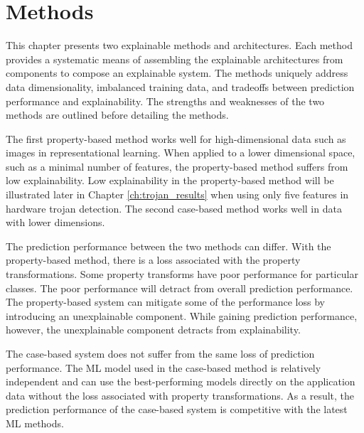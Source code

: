 \chapter{Methods} \label{ch:methods}

This chapter presents two explainable methods and architectures. Each method
provides a systematic means of assembling the explainable architectures from
components to compose an explainable system. The methods uniquely address
data dimensionality, imbalanced training data, and tradeoffs between prediction
performance and explainability. The strengths and weaknesses of the two methods
are outlined before detailing the methods.

The first property-based method works well for high-dimensional data such as
images in representational learning. When applied to a lower dimensional space,
such as a minimal number of features, the property-based method suffers from low
explainability. Low explainability in the property-based method will be
illustrated later in Chapter \ref{ch:trojan_results} when using only five
features in hardware trojan detection. The second case-based method works well
in data with lower dimensions.

The prediction performance between the two methods can differ. With the
property-based method, there is a loss associated with the property
transformations. Some property transforms have poor performance for particular
classes. The poor performance will detract from overall prediction performance.
The property-based system can mitigate some of the performance loss by
introducing an unexplainable component. While gaining prediction performance,
however, the unexplainable component detracts from explainability. 

The case-based system does not suffer from the same loss of prediction
performance. The ML model used in the case-based method is relatively
independent and can use the best-performing models directly on the application
data without the loss associated with property transformations. As a result, the
prediction performance of the case-based system is competitive with the latest
ML methods.


